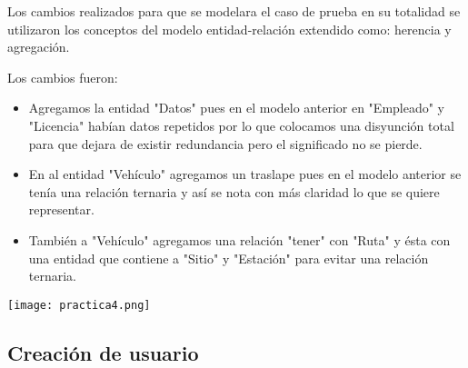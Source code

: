 \documentclass[12pt, letterpaper]{article}
\begin{document}
        Los cambios realizados para que se modelara el caso de prueba en su
        totalidad se utilizaron los conceptos del modelo entidad-relación 
        extendido como: herencia y agregación.

        Los cambios fueron:

        \begin{itemize}
            \item   Agregamos la entidad "Datos" pues en el modelo anterior en
                    "Empleado" y "Licencia" habían datos repetidos por lo que 
                    colocamos una disyunción total para que dejara de existir
                    redundancia pero el significado no se pierde.
            \item   En al entidad "Vehículo" agregamos un traslape pues en el 
                    modelo anterior se tenía una relación ternaria y así se
                    nota con más claridad lo que se quiere representar.
            \item   También a "Vehículo" agregamos una relación "tener" con 
                    "Ruta" y ésta con una entidad que contiene a "Sitio" y
                    "Estación" para evitar una relación ternaria.
        \end{itemize}

        \texttt{[image: practica4.png]}

        \subsection*{Creación de usuario}
\end{document}
